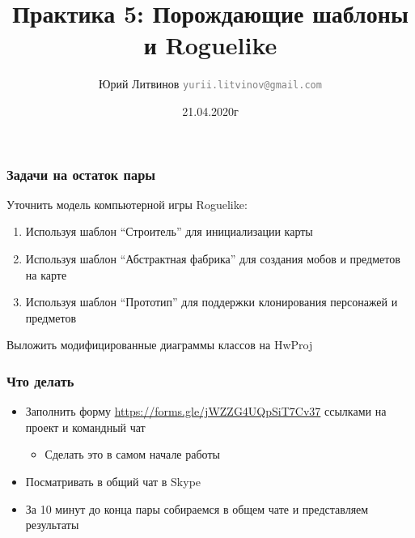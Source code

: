 \documentclass[xetex,mathserif,serif]{beamer}
\title{Практика 5: Порождающие шаблоны и Roguelike}
\author[Юрий Литвинов]{Юрий Литвинов \newline \textcolor{gray}{\small\texttt{yurii.litvinov@gmail.com}}}
\date{21.04.2020г}
\begin{document}
    
    \frame{\titlepage}

    \begin{frame}
        \frametitle{Задачи на остаток пары}
        Уточнить модель компьютерной игры Roguelike:

        \begin{enumerate}
            \item Используя шаблон ``Строитель'' для инициализации карты
            \item Используя шаблон ``Абстрактная фабрика'' для создания мобов и предметов на карте
            \item Используя шаблон ``Прототип'' для поддержки клонирования персонажей и предметов
        \end{enumerate}

        Выложить модифицированные диаграммы классов на HwProj
    \end{frame}

    \begin{frame}
        \frametitle{Что делать}
        \begin{itemize}
            \item Заполнить форму \url{https://forms.gle/jWZZG4UQpSiT7Cv37} ссылками на проект и командный чат
            \begin{itemize}
                \item Сделать это в самом начале работы
            \end{itemize}
            \item Посматривать в общий чат в Skype
            \item За 10 минут до конца пары собираемся в общем чате и представляем результаты
        \end{itemize}
    \end{frame}
\end{document}
